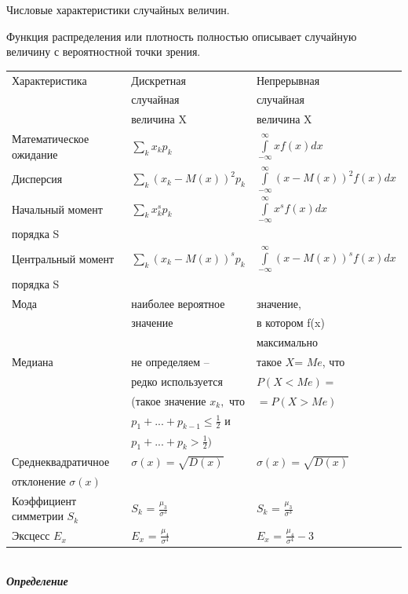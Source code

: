 \documentclass[russian, 12pt, fleqn]{article}
\begin{document}
\begin{center}
$\textbf{Числовые характеристики случайных величин. }$\\
\end{center}
Функция распределения или плотность полностью описывает случайную величину с вероятностной точки зрения.\\
\begin{tabular}[b]{ | l | l | l | }
\hline
Характеристика &  Дискретная & Непрерывная   \\
 &  случайная  & случайная  \\
 &  величина X  & величина X  \\
\hline
Математическое ожидание &  $ \sum\limits_{k} x_kp_k$ & $\int\limits_{-\infty}^{\infty}xf(x)dx$\\
Дисперсия & $\sum\limits_{k}^{}(x_k-M(x))^2p_k$ & $\int\limits_{-\infty}^{\infty}(x- M(x))^2f(x)dx$\\
Начальный момент & $\sum\limits_{k} x^s_kp_k$ & $\int\limits_{-\infty}^{\infty}x^sf(x)dx$\\
порядка S& &\\
Центральный момент& $\sum\limits_{k}^{}(x_k-M(x))^sp_k$& $\int\limits_{-\infty}^{\infty}(x- M(x))^sf(x)dx$\\
порядка S& &\\
Мода&наиболее вероятное&значение, \\
& значение& в котором f(x)\\
& &максимально\\
Медиана&не определяем -- &такое $X$= $Me$, что \\
&редко используется&$P(X < Me)=$\\
&(такое значение $x_k,$ что &  $=P(X > Me)$\\
& $p_1+ ...+p_{k - 1} \leq \frac{1}{2}$ и&\\
& $p_1+ ...+p_{k} > \frac{1}{2})$ & \\
Среднеквадратичное  & $\sigma(x) = \sqrt{D(x)}$ & $\sigma(x) = \sqrt{D(x)}$\\
отклонение $\sigma(x)$ & &\\
Коэффициент симметрии $S_k$ & $S_k$ = $\frac{\mu_3}{\sigma^3}$ &  $S_k$ = $\frac{\mu_3}{\sigma^3}$ \\
Эксцесс $E_x$ & $E_x$ = $\frac{\mu_4}{\sigma^4}$ & $E_x$ = $\frac{\mu_4}{\sigma^4} - 3$\\
\hline
\end{tabular}\\
\textit{\textbf{Определение}}\\
\end{document}
